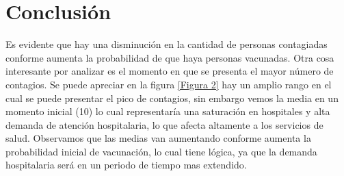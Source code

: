 \documentclass{article}
\begin{document}
\section{Conclusi\'on}

Es evidente que hay una disminuci\'on en la cantidad de personas contagiadas conforme aumenta la probabilidad de que haya personas vacunadas.
Otra cosa interesante por analizar es el momento en que se presenta el mayor n\'umero de contagios. Se puede apreciar en la figura \ref{Figura 2} hay un amplio rango en el cual se puede presentar el pico de contagios, sin embargo vemos la media en un momento inicial (10) lo cual representar\'ia una saturaci\'on en hospitales y alta demanda de atenci\'on hospitalaria, lo que afecta altamente a los servicios de salud. Observamos que las medias van aumentando conforme aumenta la probabilidad inicial de vacunaci\'on, lo cual tiene l\'ogica, ya que la demanda hospitalaria ser\'a  en un periodo de tiempo mas extendido.




\end{document}
